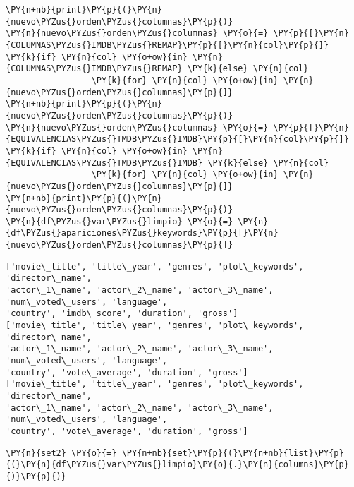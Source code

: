 \begin{tcolorbox}[breakable, size=fbox, boxrule=1pt, pad at break*=1mm,colback=cellbackground, colframe=cellborder]
\begin{Verbatim}[commandchars=\\\{\}]
\PY{n+nb}{print}\PY{p}{(}\PY{n}{nuevo\PYZus{}orden\PYZus{}columnas}\PY{p}{)}
\PY{n}{nuevo\PYZus{}orden\PYZus{}columnas} \PY{o}{=} \PY{p}{[}\PY{n}{COLUMNAS\PYZus{}IMDB\PYZus{}REMAP}\PY{p}{[}\PY{n}{col}\PY{p}{]} \PY{k}{if} \PY{n}{col} \PY{o+ow}{in} \PY{n}{COLUMNAS\PYZus{}IMDB\PYZus{}REMAP} \PY{k}{else} \PY{n}{col}
                 \PY{k}{for} \PY{n}{col} \PY{o+ow}{in} \PY{n}{nuevo\PYZus{}orden\PYZus{}columnas}\PY{p}{]}
\PY{n+nb}{print}\PY{p}{(}\PY{n}{nuevo\PYZus{}orden\PYZus{}columnas}\PY{p}{)}
\PY{n}{nuevo\PYZus{}orden\PYZus{}columnas} \PY{o}{=} \PY{p}{[}\PY{n}{EQUIVALENCIAS\PYZus{}TMDB\PYZus{}IMDB}\PY{p}{[}\PY{n}{col}\PY{p}{]} \PY{k}{if} \PY{n}{col} \PY{o+ow}{in} \PY{n}{EQUIVALENCIAS\PYZus{}TMDB\PYZus{}IMDB} \PY{k}{else} \PY{n}{col}
                 \PY{k}{for} \PY{n}{col} \PY{o+ow}{in} \PY{n}{nuevo\PYZus{}orden\PYZus{}columnas}\PY{p}{]}
\PY{n+nb}{print}\PY{p}{(}\PY{n}{nuevo\PYZus{}orden\PYZus{}columnas}\PY{p}{)}
\PY{n}{df\PYZus{}var\PYZus{}limpio} \PY{o}{=} \PY{n}{df\PYZus{}apariciones\PYZus{}keywords}\PY{p}{[}\PY{n}{nuevo\PYZus{}orden\PYZus{}columnas}\PY{p}{]}
\end{Verbatim}
\end{tcolorbox}

    \begin{Verbatim}[commandchars=\\\{\}]
['movie\_title', 'title\_year', 'genres', 'plot\_keywords', 'director\_name',
'actor\_1\_name', 'actor\_2\_name', 'actor\_3\_name', 'num\_voted\_users', 'language',
'country', 'imdb\_score', 'duration', 'gross']
['movie\_title', 'title\_year', 'genres', 'plot\_keywords', 'director\_name',
'actor\_1\_name', 'actor\_2\_name', 'actor\_3\_name', 'num\_voted\_users', 'language',
'country', 'vote\_average', 'duration', 'gross']
['movie\_title', 'title\_year', 'genres', 'plot\_keywords', 'director\_name',
'actor\_1\_name', 'actor\_2\_name', 'actor\_3\_name', 'num\_voted\_users', 'language',
'country', 'vote\_average', 'duration', 'gross']
    \end{Verbatim}

    \begin{tcolorbox}[breakable, size=fbox, boxrule=1pt, pad at break*=1mm,colback=cellbackground, colframe=cellborder]
\begin{Verbatim}[commandchars=\\\{\}]
\PY{n}{set2} \PY{o}{=} \PY{n+nb}{set}\PY{p}{(}\PY{n+nb}{list}\PY{p}{(}\PY{n}{df\PYZus{}var\PYZus{}limpio}\PY{o}{.}\PY{n}{columns}\PY{p}{)}\PY{p}{)}
\end{Verbatim}
\end{tcolorbox}

